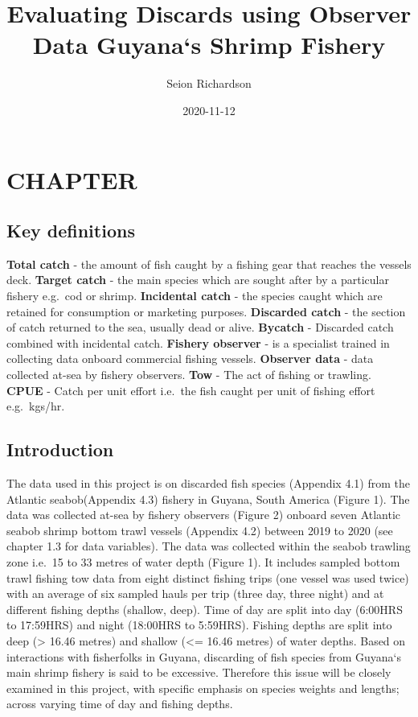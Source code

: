 \documentclass[
]{book}
\title{Evaluating Discards using Observer Data Guyana`s Shrimp Fishery}
\author{Seion Richardson}
\date{2020-11-12}
\begin{document}
\maketitle

{
\setcounter{tocdepth}{1}
\tableofcontents
}
\hypertarget{chapter}{%
\chapter{CHAPTER}\label{chapter}}

\hypertarget{key-definitions}{%
\section{Key definitions}\label{key-definitions}}

\textbf{Total catch} - the amount of fish caught by a fishing gear that reaches the vessels deck.
\textbf{Target catch} - the main species which are sought after by a particular fishery e.g.~cod or shrimp.
\textbf{Incidental catch} - the species caught which are retained for consumption or marketing purposes.
\textbf{Discarded catch} - the section of catch returned to the sea, usually dead or alive.
\textbf{Bycatch} - Discarded catch combined with incidental catch.
\textbf{Fishery observer} - is a specialist trained in collecting data onboard commercial fishing vessels.
\textbf{Observer data} - data collected at-sea by fishery observers.
\textbf{Tow} - The act of fishing or trawling.
\textbf{CPUE} - Catch per unit effort i.e.~the fish caught per unit of fishing effort e.g.~kgs/hr.

\hypertarget{introduction}{%
\section{Introduction}\label{introduction}}

The data used in this project is on discarded fish species (Appendix 4.1) from the Atlantic seabob(Appendix 4.3) fishery in Guyana, South America (Figure 1). The data was collected at-sea by fishery observers (Figure 2) onboard seven Atlantic seabob shrimp bottom trawl vessels (Appendix 4.2) between 2019 to 2020 (see chapter 1.3 for data variables). The data was collected within the seabob trawling zone i.e.~15 to 33 metres of water depth (Figure 1). It includes sampled bottom trawl fishing tow data from eight distinct fishing trips (one vessel was used twice) with an average of six sampled hauls per trip (three day, three night) and at different fishing depths (shallow, deep). Time of day are split into day (6:00HRS to 17:59HRS) and night (18:00HRS to 5:59HRS). Fishing depths are split into deep (\textgreater{} 16.46 metres) and shallow (\textless= 16.46 metres) of water depths. Based on interactions with fisherfolks in Guyana, discarding of fish species from Guyana`s main shrimp fishery is said to be excessive. Therefore this issue will be closely examined in this project, with specific emphasis on species weights and lengths; across varying time of day and fishing depths.
\end{document}
